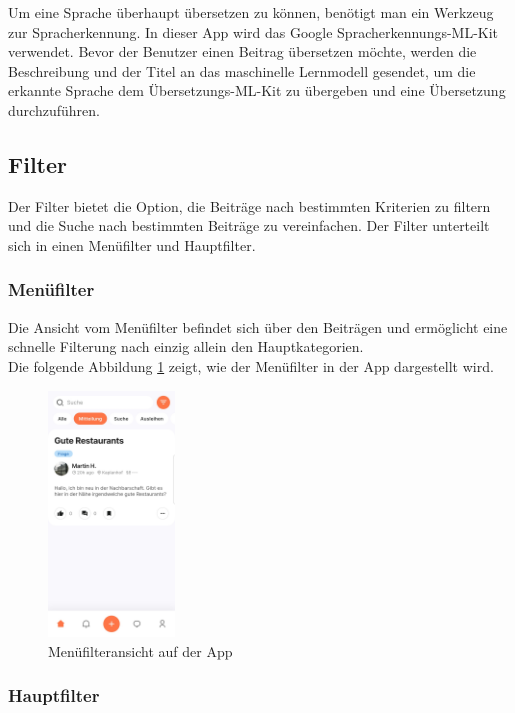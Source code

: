 Um eine Sprache überhaupt übersetzen zu können, benötigt man ein Werkzeug zur Spracherkennung. In dieser App wird das Google Spracherkennungs-ML-Kit verwendet. Bevor der Benutzer einen Beitrag übersetzen möchte, werden die Beschreibung und der Titel an das maschinelle Lernmodell gesendet, um die erkannte Sprache dem Übersetzungs-ML-Kit zu übergeben und eine Übersetzung durchzuführen.


\subsection{Filter}
Der Filter bietet die Option, die Beiträge nach bestimmten Kriterien zu filtern und die Suche nach bestimmten Beiträge zu vereinfachen. Der Filter unterteilt sich in einen Menüfilter und Hauptfilter.

\subsubsection{Menüfilter}

Die Ansicht vom Menüfilter befindet sich über den Beiträgen und ermöglicht eine schnelle Filterung nach einzig allein den Hauptkategorien.
\\
Die folgende Abbildung \ref{fig:menu-filter} zeigt, wie der Menüfilter in der App dargestellt wird.

\begin{figure}[h]
  \centering
  \includegraphics[width=0.3\textwidth]{pics/menu-filter.jpg}
  \caption{Menüfilteransicht auf der App}
  \label{fig:menu-filter}
\end{figure}

\subsubsection{Hauptfilter}


